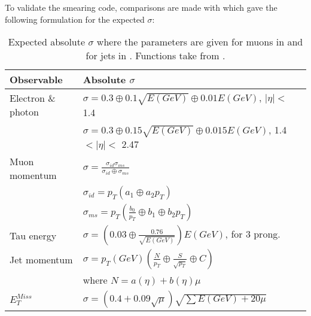 To validate the smearing code, comparisons are made with \citep{ATL-PHYS-PUB-2013-004} which gave the following formulation for the expected $\sigma$: 
\begin{table}[H]
\renewcommand{\arraystretch}{1.5} %
\begin{center}
\begin{tabular}{|l|l|}
\hline
Observable & Absolute $\sigma$ \\ \hline
Electron \& photon & $\sigma=0.3\oplus 0.1\sqrt{E(GeV)}\oplus 0.01E(GeV)$, $|\eta|<$ 1.4 \\
& $\sigma=0.3\oplus 0.15\sqrt{E(GeV)}\oplus 0.015E(GeV)$, 1.4 $<|\eta|<$ 2.47 \\ \hline 
Muon momentum& $\sigma=\frac{\sigma_{id} \sigma_{ms}}{\sigma_{id} \oplus \sigma_{ms}}$\\
& $\sigma_{id}=p_T(a_1 \oplus a_2 p_T)$\\
& $\sigma_{ms}=p_T(\frac{b_0}{p_T} \oplus b_1 \oplus b_2 p_T)$\\ \hline
Tau energy& $\sigma =(0.03\oplus \frac{0.76}{\sqrt{E(GeV)}})E(GeV)$, for 3 prong.\\ \hline
Jet momentum& $\sigma = p_T(GeV)(\frac{N}{p_T} \oplus \frac{S}{\sqrt{p_T}} \oplus C)$ \\ 
& where $N=a(\eta)+b(\eta)\mu$ \\ \hline
$E_T^{Miss}$ & $\sigma = (0.4+0.09\sqrt{\mu})\sqrt{\sum E(GeV)+20\mu}$ \\ \hline
\end{tabular}
\end{center}
\renewcommand{\arraystretch}{1.0} %
\caption{Expected absolute $\sigma$ where the parameters are given for muons in  and for jets in . Functions take from \citep{ATL-PHYS-PUB-2013-004}.}
\label{tab:expected sigma}
\end{table}


